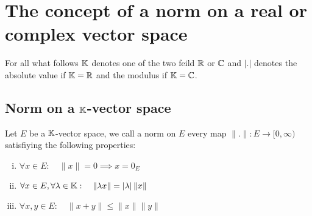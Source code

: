
% 

\lecday[2025-02-05]
% 
\chapter{The concept of a norm on a real or complex vector space}	
	For all what follows $\mathbb{K}$ denotes one of the two feild $\mathbb{R}$ or $\mathbb{C}$ and $\left| . \right|$ denotes the absolute value
	if $\mathbb{K}=\mathbb{R} $ and the modulus if $\mathbb{K}=\mathbb{C} $.

	\section{Norm on a \texorpdfstring{$\mathbb{K}$}{K}-vector space}
	\begin{definition}[Norm]
		Let $E$ be a $\mathbb{K}$-vector space, we call a norm on $E$ every map $ \| . \|  : E \longrightarrow [0, \infty) $
		satisfiying the following properties:
		\begin{enumerate}[(i)]
			\item $\forall x \in E: \quad \| x \| = 0 \implies x=0_{E}$
			\item $\forall x \in E, \forall \lambda \in \mathbb{K}: \quad \| \lambda x \| = \left| \lambda \right| \| x \|  $               
			\item $\forall x,y \in E: \quad \| x + y \| \leq  \| x \| \| y \| $
		\end{enumerate}
	
	\end{definition}
